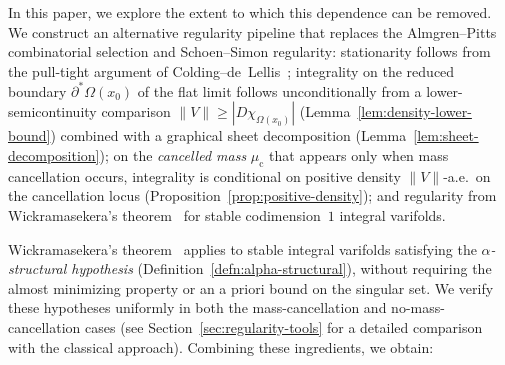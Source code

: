 In this paper, we explore the extent to which this dependence can be removed. We construct an alternative regularity pipeline that replaces the Almgren--Pitts combinatorial selection and Schoen--Simon regularity: stationarity follows from the pull-tight argument of Colding--de~Lellis~\cite{CL03}; integrality on the reduced boundary $\partial^*\Omega(x_0)$ of the flat limit follows unconditionally from a lower-semicontinuity comparison $\|V\| \geq |D\chi_{\Omega(x_0)}|$ (Lemma~\ref{lem:density-lower-bound}) combined with a graphical sheet decomposition (Lemma~\ref{lem:sheet-decomposition}); on the \emph{cancelled mass} $\mu_{\mathrm{c}}$ that appears only when mass cancellation occurs, integrality is conditional on positive density $\|V\|$-a.e.\ on the cancellation locus (Proposition~\ref{prop:positive-density}); and regularity from Wickramasekera's theorem~\cite{Wic14} for stable codimension~$1$ integral varifolds.

Wickramasekera's theorem~\cite{Wic14} applies to stable integral varifolds satisfying the \emph{$\alpha$-structural hypothesis} (Definition~\ref{defn:alpha-structural}), without requiring the almost minimizing property or an a priori bound on the singular set. We verify these hypotheses uniformly in both the mass-cancellation and no-mass-cancellation cases (see Section~\ref{sec:regularity-tools} for a detailed comparison with the classical approach). Combining these ingredients, we obtain:

